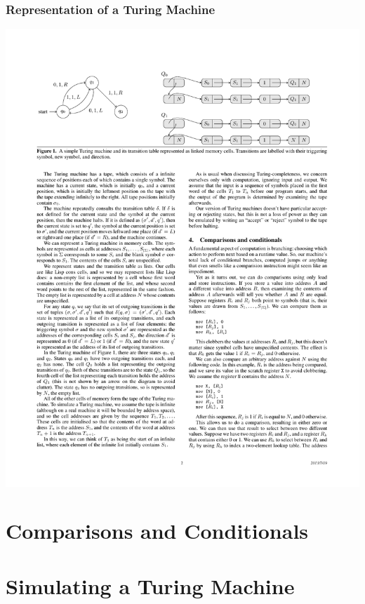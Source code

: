 \documentclass{beamer}
\begin{document}
\begin{frame}[fragile]
\frametitle{Representation of a Turing Machine}

\begin{center}
\includegraphics[scale=0.6]{figures/TMrepresentation}
\end{center}
\end{frame}
\section{Comparisons and Conditionals}

%

\section{Simulating a Turing Machine}
\end{document}
